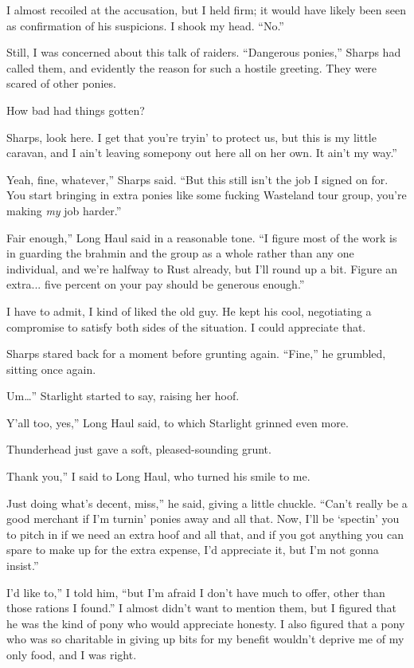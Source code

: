 I almost recoiled at the accusation, but I held firm; it would have likely been seen as confirmation of his suspicions. I shook my head. “No.”

Still, I was concerned about this talk of raiders. “Dangerous ponies,” Sharps had called them, and evidently the reason for such a hostile greeting. They were scared of other ponies.

How bad had things gotten?

\leavevmode{}Sharps, look here. I get that you’re tryin’ to protect us, but this is my little caravan, and I ain’t leaving somepony out here all on her own. It ain’t my way.”

\leavevmode{}Yeah, fine, whatever,” Sharps said. “But this still isn’t the job I signed on for. You start bringing in extra ponies like some fucking Wasteland tour group, you’re making \textit{my} job harder.”

\leavevmode{}Fair enough,” Long Haul said in a reasonable tone. “I figure most of the work is in guarding the brahmin and the group as a whole rather than any one individual, and we’re halfway to Rust already, but I’ll round up a bit. Figure an extra... five percent on your pay should be generous enough.”

I have to admit, I kind of liked the old guy. He kept his cool, negotiating a compromise to satisfy both sides of the situation. I could appreciate that.

Sharps stared back for a moment before grunting again. “Fine,” he grumbled, sitting once again.

\leavevmode{}Um…” Starlight started to say, raising her hoof.

\leavevmode{}Y’all too, yes,” Long Haul said, to which Starlight grinned even more.

Thunderhead just gave a soft, pleased-sounding grunt.

\leavevmode{}Thank you,” I said to Long Haul, who turned his smile to me.

\leavevmode{}Just doing what’s decent, miss,” he said, giving a little chuckle. “Can’t really be a good merchant if I’m turnin’ ponies away and all that. Now, I’ll be ‘spectin’ you to pitch in if we need an extra hoof and all that, and if you got anything you can spare to make up for the extra expense, I’d appreciate it, but I’m not gonna insist.”

\leavevmode{}I’d like to,” I told him, “but I’m afraid I don’t have much to offer, other than those rations I found.” I almost didn’t want to mention them, but I figured that he was the kind of pony who would appreciate honesty. I also figured that a pony who was so charitable in giving up bits for my benefit wouldn’t deprive me of my only food, and I was right.

